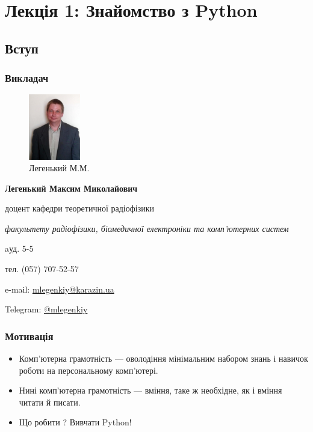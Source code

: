 \section*{Лекція 1: Знайомство з Python}
 
\subsection{Вступ}
\begin{frame}
\frametitle{Викладач}
\begin{figure}
\includegraphics[width=0.2\textwidth]{pictures/myphoto}
\caption{Легенький М.М.}
\label{myphoto}
\end{figure}
\textbf{Легенький Максим Миколайович}

доцент кафедри теоретичної радіофізики

\textit{факультету радіофізики, біомедичної електроніки та комп’ютерних систем}

aуд. 5-5

тел. (057) 707-52-57

e-mail: \href{mailto:mlegenkiy@karazin.ua}{mlegenkiy@karazin.ua}

Telegram: \href{https://t.me/mlegenkiy}{@mlegenkiy}
\end{frame}

\begin{frame}
\frametitle{Мотивація}
\begin{itemize}
   \item Комп'ютерна грамотність — оволодіння мінімальним набором знань і навичок роботи на персональному комп'ютері. 
  \item Нині комп'ютерна грамотність —  вміння, таке ж необхідне, як і вміння читати й писати. 
   \item Що робити ? Вивчати Python!
\end{itemize}
\end{frame}

